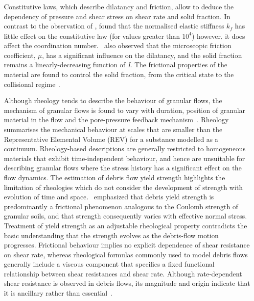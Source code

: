 
Constitutive laws, which describe dilatancy and friction, allow to 
deduce the dependency of pressure and shear stress on shear rate and solid 
fraction. In contrast to the observation of \citet{Campbell2002}, 
\citet{DaCruz2005} found that the normalised elastic stiffness $\mathit{k_f}$ 
has little effect on the constitutive law (for values greater than $10^{4}$) 
however, it does affect the coordination number.~\citet{DaCruz2005} also 
observed that the microscopic friction coefficient, $\mu$, has a significant 
influence on the dilatancy, and the solid fraction remains a 
linearly-decreasing function of \textit{I}. The 
frictional properties of the material are found to control the solid fraction, 
from the critical state to the collisional regime~\citep{DaCruz2005}. 

Although rheology tends to describe the behaviour of granular flows, the 
mechanism of granular flows is found to vary with duration, position of 
granular material in the flow and the pore-pressure feedback 
mechanism~\citep{Iverson2003}. Rheology summarises the mechanical behaviour at 
scales that are smaller than the Representative Elemental Volume (REV) 
for a substance modelled as a continuum. Rheology-based descriptions are 
generally restricted to homogeneous materials that exhibit time-independent 
behaviour, and hence are unsuitable for describing granular flows where the 
stress 
history has a significant effect on the flow dynamics. The estimation of debris 
flow yield strength highlights the limitation of rheologies which do not 
consider the development of strength with evolution of time and 
space.~\citet{Johnson1965} emphasized that debris yield strength is 
predominantly a frictional phenomenon analogous to the Coulomb strength of 
granular soils, and that strength consequently varies with effective normal 
stress. Treatment of yield strength as an adjustable rheological property 
contradicts the basic understanding that the strength evolves as the 
debris-flow motion progresses. Frictional behaviour implies no explicit 
dependence of shear resistance on shear rate, whereas rheological formulas 
commonly used to model debris flows generally include a viscous component that 
specifies a fixed functional relationship between shear resistances and shear 
rate. Although rate-dependent shear resistance is observed in debris flows, its 
magnitude and origin indicate that it is ancillary rather than 
essential~\citep{Iverson2003}.

